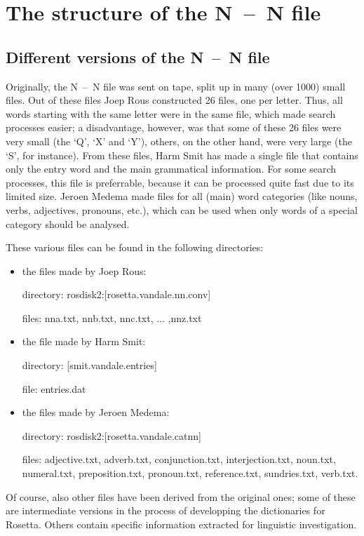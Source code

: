 \section{The structure of the N~--~N file}
\subsection{Different versions of the N~--~N file}
Originally, the N~--~N file was sent on tape, split up in many (over 1000) small
files. Out of these files Joep Rous constructed 26 files, one per letter.
Thus, all words starting with the same letter were in the same file, which made
search processes easier; a disadvantage, however, was that some of these 26
files were very small (the `Q', `X' and `Y'), others, on the other hand, were
very large (the `S', for instance). From these files, Harm Smit has made a 
single file
that contains only the entry word and the main grammatical information. For
some search processes, this file is preferrable, because it can be processed
quite fast due to its limited size. Jeroen Medema made files for all (main) 
word categories (like nouns, verbs, adjectives, pronouns, etc.), which can be 
used when only words of a special category should be analysed. 

These various files can be found in the following directories:
\begin{itemize}
   \item the files made by Joep Rous:

         directory: rosdisk2:[rosetta.vandale.nn.conv]

         files: nna.txt, nnb.txt, nnc.txt, ... ,nnz.txt
   \item the file made by Harm Smit:

         directory: [smit.vandale.entries]

         file: entries.dat 
   \item the files made by Jeroen Medema:

         directory: rosdisk2:[rosetta.vandale.catnn]

         files: adjective.txt, adverb.txt, 
                conjunction.txt, interjection.txt, 
                noun.txt, numeral.txt, preposition.txt, 
                pronoun.txt, reference.txt, 
                sundries.txt, verb.txt.
\end{itemize}
Of course, also other files have been derived from the original ones;
some of these are intermediate versions in the process of developping the
dictionaries for Rosetta. Others contain specific information extracted 
for linguistic investigation.
\newpage
